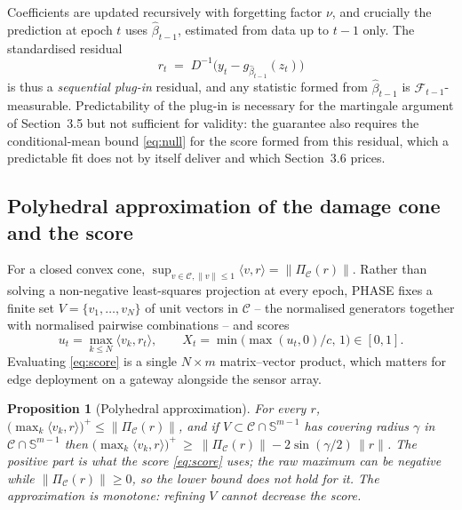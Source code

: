 \documentclass[12pt,a4paper]{article}
\newcommand{\rev}[1]{#1}
\newcommand{\rev}[1]{{\color{revcol}#1}}
\newcommand{\rtwo}[1]{#1}
\newcommand{\rtwo}[1]{{\color{revcolb}#1}}
\newtheorem{proposition}{Proposition}
\newcommand{\F}{\mathcal{F}}
\newcommand{\Cone}{\mathcal{C}}
\begin{document}
Coefficients are updated recursively with forgetting factor $\nu$, and crucially the prediction at epoch $t$ uses $\hat\beta_{t-1}$, estimated from data up to $t-1$ only. The standardised residual
\begin{equation}
r_t \;=\; D^{-1}\big(y_t-g_{\hat\beta_{t-1}}(z_t)\big)
\label{eq:resid}
\end{equation}
is thus a \emph{sequential plug-in} residual, and any statistic formed from $\hat\beta_{t-1}$ is $\F_{t-1}$-measurable. \rtwo{\rtwo{Predictability of the plug-in is necessary for the martingale argument of Section~3.5 but not sufficient for validity: the guarantee also requires the conditional-mean bound \eqref{eq:null} for the score formed from this residual, which a predictable fit does not by itself deliver and which Section~3.6 prices.}}

\subsection{Polyhedral approximation of the damage cone and the score}

For a closed convex cone, $\sup_{v\in\Cone,\|v\|\le1}\langle v,r\rangle=\|\Pi_\Cone(r)\|$. Rather than solving a non-negative least-squares projection at every epoch, PHASE fixes a finite set $V=\{v_1,\dots,v_N\}$ of unit vectors in $\Cone$ -- the normalised generators together with normalised pairwise combinations -- and scores
\begin{equation}
u_t=\max_{k\le N}\langle v_k,r_t\rangle,\qquad
X_t=\min\!\big(\max(u_t,0)/c,\,1\big)\in[0,1].
\label{eq:score}
\end{equation}
Evaluating \eqref{eq:score} is a single $N\times m$ matrix--vector product, which matters for edge deployment on a gateway alongside the sensor array.

\begin{proposition}[Polyhedral approximation]\label{prop:poly}
\color{revcolb}For every $r$, $\big(\max_k\langle v_k,r\rangle\big)^{+}\le\|\Pi_\Cone(r)\|$, and if $V\subset\Cone\cap\mathbb{S}^{m-1}$ has covering radius $\gamma$ in $\Cone\cap\mathbb{S}^{m-1}$ then \rev{$\big(\max_k\langle v_k,r\rangle\big)^{+}\ \ge\ \|\Pi_\Cone(r)\|-2\sin(\gamma/2)\,\|r\|$.\color{revcol} \color{revcolb}The positive part is what the score \eqref{eq:score} uses; the raw maximum can be negative while $\|\Pi_\Cone(r)\|\ge0$, so the lower bound does not hold for it.} The approximation is monotone: refining $V$ cannot decrease the score.\color{black}
\end{proposition}
\end{document}

